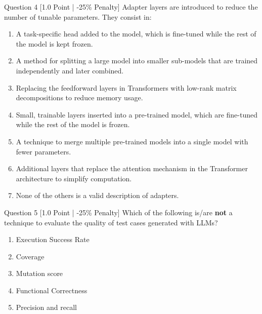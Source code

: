 \documentclass[11pt,a4paper]{article}
\begin{document}
\begin{questionbox}{Question 4 \hfill [1.0 Point | -25\% Penalty]}
Adapter layers are introduced to reduce the number of tunable parameters. They consist in:
\begin{enumerate}[label=(\alph*)]
    \item A task-specific head added to the model, which is fine-tuned while the rest of the model is kept frozen.
    \item A method for splitting a large model into smaller sub-models that are trained independently and later combined.
    \item Replacing the feedforward layers in Transformers with low-rank matrix decompositions to reduce memory usage.
    \item Small, trainable layers inserted into a pre-trained model, which are fine-tuned while the rest of the model is frozen.
    \item A technique to merge multiple pre-trained models into a single model with fewer parameters.
    \item Additional layers that replace the attention mechanism in the Transformer architecture to simplify computation.
    \item None of the others is a valid description of adapters.
\end{enumerate}
\end{questionbox}

\begin{questionbox}{Question 5 \hfill [1.0 Point | -25\% Penalty]}
Which of the following is/are \textbf{not} a technique to evaluate the quality of test cases generated with LLMs?
\begin{enumerate}[label=(\alph*)]
    \item Execution Success Rate
    \item Coverage
    \item Mutation score
    \item Functional Correctness
    \item Precision and recall
\end{enumerate}
\end{questionbox}
\end{document}
